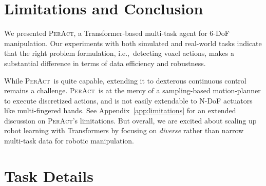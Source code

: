 \documentclass{article}
\newcommand{\appsecref}[1]{Appendix~\ref{#1}}
\newcommand{\ie}{\textrm{i.e.,}\xspace}
\newcommand{\model}{\textsc{PerAct}}
\begin{document}
\vspace{-0.1cm}
\section{Limitations and Conclusion}
\vspace{-0.1cm}
We presented \model, a Transformer-based multi-task agent for 6-DoF manipulation. Our experiments with both simulated and real-world tasks indicate that the right problem formulation, \ie~detecting voxel actions, makes a substantial difference in terms of data efficiency and robustness. 

While \model~is quite capable, extending it to dexterous continuous control remains a challenge. \model~is at the mercy of a sampling-based motion-planner to execute discretized actions, and is not easily extendable to N-DoF actuators like multi-fingered hands. See \appsecref{app:limitations} for an extended discussion on \model's limitations.
But overall, we are excited about scaling up robot learning with Transformers by focusing on \textit{diverse} rather than narrow multi-task data for robotic manipulation. 






  

\newpage
\appendix

\section{Task Details} \label{app:task_details}
\end{document}
